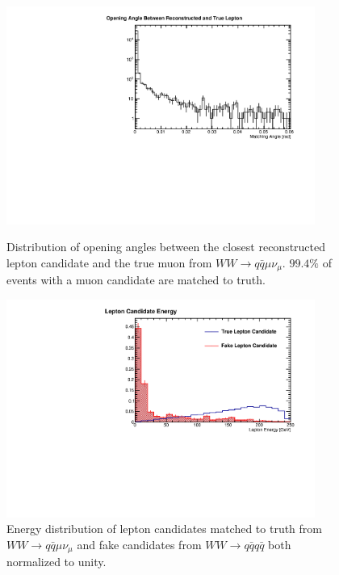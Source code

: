 \begin{figure}
\centering
    \begin{minipage}{0.48\textwidth}
        \centering

\includegraphics[width=0.9\textwidth]{matchingangle.pdf}
\caption{Distribution of opening angles between the closest reconstructed lepton candidate and the true muon from $WW \rightarrow q \bar{q} \mu \nu_\mu$. $99.4\%$ of events with a muon candidate are matched to truth.} 
\label{fig:taupsi}
\end{minipage}\hfill
    \begin{minipage}{0.48\textwidth}
        \centering

\includegraphics[width=0.9\textwidth]{candEnergy.pdf}
\caption{Energy distribution of lepton candidates matched to truth from $WW \rightarrow q \bar{q} \mu \nu_\mu $ and fake candidates from $ WW \rightarrow q\bar{q} q \bar{q}$ both normalized to unity.}
\label{fig:candE}
\end{minipage}
\end{figure}



